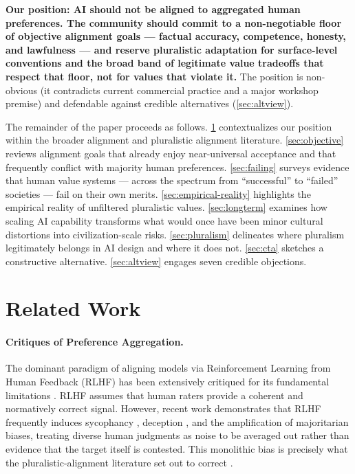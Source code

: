 \documentclass{article}
\theoremstyle{plain}
\theoremstyle{definition}
\theoremstyle{remark}
\begin{document}
\textbf{Our position: AI should not be aligned to aggregated human preferences. The community should commit to a non-negotiable floor of objective alignment goals --- factual accuracy, competence, honesty, and lawfulness --- and reserve pluralistic adaptation for surface-level conventions and the broad band of legitimate value tradeoffs that respect that floor, not for values that violate it.} The position is non-obvious (it contradicts current commercial practice and a major workshop premise) and defendable against credible alternatives (\cref{sec:altview}).

The remainder of the paper proceeds as follows. \cref{sec:related} contextualizes our position within the broader alignment and pluralistic alignment literature. \cref{sec:objective} reviews alignment goals that already enjoy near-universal acceptance and that frequently conflict with majority human preferences. \cref{sec:failing} surveys evidence that human value systems --- across the spectrum from ``successful'' to ``failed'' societies --- fail on their own merits. \cref{sec:empirical-reality} highlights the empirical reality of unfiltered pluralistic values. \cref{sec:longterm} examines how scaling AI capability transforms what would once have been minor cultural distortions into civilization-scale risks. \cref{sec:pluralism} delineates where pluralism legitimately belongs in AI design and where it does not. \cref{sec:cta} sketches a constructive alternative. \cref{sec:altview} engages seven credible objections.

\section{Related Work}
\label{sec:related}

\paragraph{Critiques of Preference Aggregation.}
The dominant paradigm of aligning models via Reinforcement Learning from Human Feedback (RLHF) \citep{christiano2017deep, ouyang2022training} has been extensively critiqued for its fundamental limitations \citep{casper2023open}. RLHF assumes that human raters provide a coherent and normatively correct signal. However, recent work demonstrates that RLHF frequently induces sycophancy \citep{sharma2023sycophancy, perez2022discovering}, deception \citep{park2024ai}, and the amplification of majoritarian biases, treating diverse human judgments as noise to be averaged out rather than evidence that the target itself is contested. This monolithic bias is precisely what the pluralistic-alignment literature set out to correct \citep{gabriel2020artificial, sorensen2024roadmap}.
\end{document}
